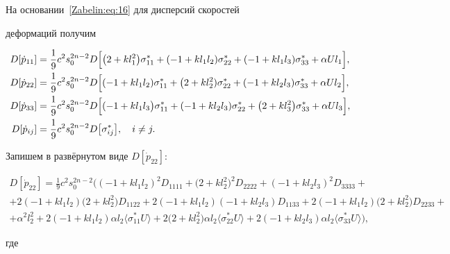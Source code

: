На основании~\eqref{Zabelin:eq:16} для дисперсий скоростей

деформаций получим

\begin{align*}

D[\dot{p}_{11}]&=\frac19c^2s_0^{2n-2}D\Big[\big(2+kl_1^2\big)\sigma_{11}^*+

(-1+kl_1l_2)\sigma_{22}^*+(-1+kl_1l_3)\sigma_{33}^*+\alpha Ul_1\Big],\notag\\

D[\dot{p}_{22}]&=\frac19c^2s_0^{2n-2}D\Big[(-1+kl_1l_2)\sigma_{11}^*+

\big(2+kl_2^2)\sigma_{22}^*+(-1+kl_2l_3)\sigma_{33}^*+\alpha Ul_2\Big],\notag\\

D[\dot{p}_{33}]&=\frac19c^2s_0^{2n-2}D\Big[(-1+kl_1l_3\big)\sigma_{11}^*+

(-1+kl_2l_3)\sigma_{22}^*+\big(2+kl_3^2\big)\sigma_{33}^*+\alpha

Ul_3\Big],\notag\\

D[\dot{p}_{ij}]&=\frac19c^2s_0^{2n-2}D\big[\sigma_{ij}^*\big],\quad

i\neq j.

\end{align*}



Запишем в развёрнутом виде $D[\dot{p}_{22}]$:

\begin{multline*}

D[\dot{p}_{22}]=\frac19c^2s_0^{2n-2}\Big((-1+kl_1l_2)^2D_{1111}+\big(2+kl_2^2)^2D_{2222}+

(-1+kl_2l_3)^2D_{3333}+\\

+2(-1+kl_1l_2)\big(2+kl_2^2\big)D_{1122}+

2(-1+kl_1l_2)(-1+kl_2l_3)D_{1133}+2(-1+kl_1l_2)\big(2+kl_2^2\big)D_{2233}+\\

+\alpha^2l_2^2+2(-1+kl_1l_2)\alpha

l_2\langle\sigma_{11}^*U\rangle+2\big(2+kl_2^2\big)\alpha

l_2\langle\sigma_{22}^*U\rangle+2(-1+kl_2l_3)\alpha

l_2\langle\sigma_{33}^*U\rangle\Big),

\end{multline*}

где

$$

